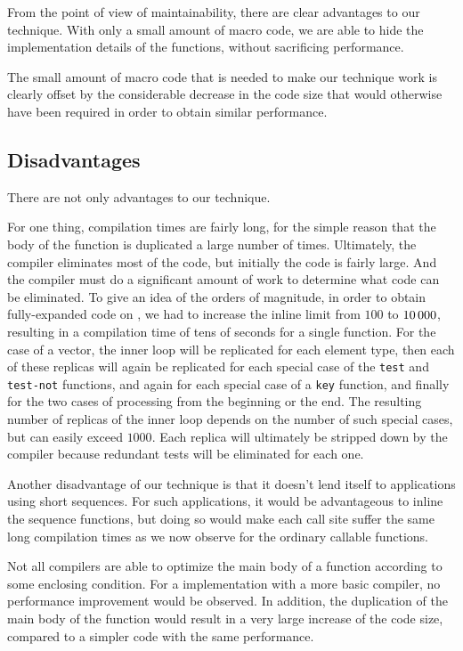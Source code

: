 From the point of view of maintainability, there are clear advantages
to our technique.  With only a small amount of macro code, we are able
to hide the implementation details of the functions, without
sacrificing performance.

The small amount of macro code that is needed to make our technique
work is clearly offset by the considerable decrease in the code size
that would otherwise have been required in order to obtain similar
performance.

\subsection{Disadvantages}

There are not only advantages to our technique.

For one thing, compilation times are fairly long, for the simple
reason that the body of the function is duplicated a large number of
times.  Ultimately, the compiler eliminates most of the code, but
initially the code is fairly large.  And the compiler must do a
significant amount of work to determine what code can be eliminated.
To give an idea of the orders of magnitude, in order to obtain
fully-expanded code on \sbcl{}, we had to increase the inline limit from
$100$ to $10\thinspace000$, resulting in a compilation time of tens of
seconds for a single function.  For the case of a vector, the inner
loop will be replicated for each element type, then each of these
replicas will again be replicated for each special case of the
\texttt{test} and \texttt{test-not} functions, and again for each
special case of a \texttt{key} function, and finally for the two cases
of processing from the beginning or the end.  The resulting number of
replicas of the inner loop depends on the number of such special
cases, but can easily exceed $1000$.  Each replica will ultimately be
stripped down by the compiler because redundant tests will be
eliminated for each one.

Another disadvantage of our technique is that it doesn't lend itself
to applications using short sequences.  For such applications, it
would be advantageous to inline the sequence functions, but doing so
would make each call site suffer the same long compilation times as we
now observe for the ordinary callable functions.

Not all compilers are able to optimize the main body of a function
according to some enclosing condition.  For a \commonlisp{}
implementation with a more basic compiler, no performance improvement
would be observed.  In addition, the duplication of the main body of
the function would result in a very large increase of the code size,
compared to a simpler code with the same performance.

